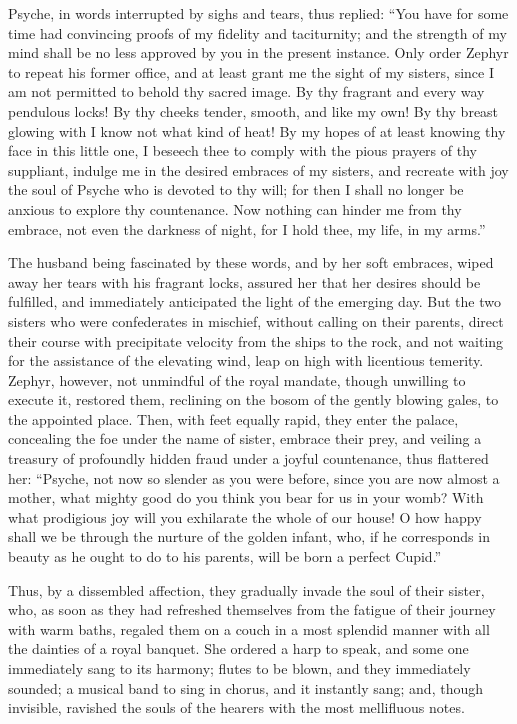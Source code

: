 \documentclass[12pt]{article}
\begin{document}
Psyche, in words interrupted by sighs and tears, thus replied: ``You have for
some time had convincing proofs of my fidelity and taciturnity; and the
strength of my mind shall be no less approved by you in the present instance.
Only order Zephyr to repeat his former office, and at least grant me the sight
of my sisters, since I am not permitted to behold thy sacred image. By thy
fragrant and every way pendulous locks! By thy cheeks tender, smooth, and like
my own! By thy breast glowing with I know not what kind of heat! By my hopes of
at least knowing thy face in this little one, I beseech thee to comply with the
pious prayers of thy suppliant, indulge me in the desired embraces of my
sisters, and recreate with joy the soul of Psyche who is devoted to thy will;
for then I shall no longer be anxious to explore thy countenance. Now nothing
can hinder me from thy embrace, not even the darkness of night, for I hold
thee, my life, in my arms.''

The husband being fascinated by these words, and by her soft embraces, wiped
away her tears with his fragrant locks, assured her that her desires should be
fulfilled, and immediately anticipated the light of the emerging day. But the
two sisters who were confederates in mischief, without calling on their
parents, direct their course with precipitate velocity from the ships to the
rock, and not waiting for the assistance of the elevating wind, leap on high
with licentious temerity. Zephyr, however, not unmindful of the royal mandate,
though unwilling to execute it, restored them, reclining on the bosom of the
gently blowing gales, to the appointed place. Then, with feet equally rapid,
they enter the palace, concealing the foe under the name of sister, embrace
their prey, and veiling a treasury of profoundly hidden fraud under a joyful
countenance, thus flattered her: ``Psyche, not now so slender as you were
before, since you are now almost a mother, what mighty good do you think you
bear for us in your womb? With what prodigious joy will you exhilarate the
whole of our house! O how happy shall we be through the nurture of the golden
infant, who, if he corresponds in beauty as he ought to do to his parents, will
be born a perfect Cupid.''

Thus, by a dissembled affection, they gradually invade the soul of their
sister, who, as soon as they had refreshed themselves from the fatigue of their
journey with warm baths, regaled them on a couch in a most splendid manner with
all the dainties of a royal banquet. She ordered a harp to speak, and some one
immediately sang to its harmony; flutes to be blown, and they immediately
sounded; a musical band to sing in chorus, and it instantly sang; and, though
invisible, ravished the souls of the hearers with the most mellifluous notes.
\end{document}
